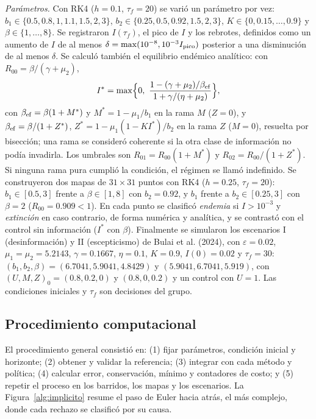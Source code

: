 \emph{Parámetros.} Con RK4 ($h=0.1$, $\tau_f=20$) se varió un parámetro por vez: $b_1\in\{0.5,0.8,1,1.1,1.5,2,3\}$, $b_2\in\{0.25,0.5,0.92,1.5,2,3\}$, $K\in\{0,0.15,\dots,0.9\}$ y $\beta\in\{1,\dots,8\}$. Se registraron $I(\tau_f)$, el pico de $I$ y los rebrotes, definidos como un aumento de $I$ de al menos $\delta=\max(10^{-8},10^{-3}I_{\rm pico})$ posterior a una disminución de al menos $\delta$. Se calculó también el equilibrio endémico analítico: con $R_{00}=\beta/(\gamma+\mu_2)$,
\begin{equation}
I^*=\max\Bigl\{0,\ \frac{1-(\gamma+\mu_2)/\beta_{\rm ef}}{1+\gamma/(\eta+\mu_2)}\Bigr\},
\end{equation}
con $\beta_{\rm ef}=\beta(1+M^*)$ y $M^*=1-\mu_1/b_1$ en la rama $M$ ($Z=0$), y $\beta_{\rm ef}=\beta/(1+Z^*)$, $Z^*=1-\mu_1(1-KI^*)/b_2$ en la rama $Z$ ($M=0$), resuelta por bisección; una rama se consideró coherente si la otra clase de información no podía invadirla. Los umbrales son $R_{01}=R_{00}(1+M^*)$ y $R_{02}=R_{00}/(1+Z^*)$. Si ninguna rama pura cumplió la condición, el régimen se llamó indefinido. Se construyeron dos mapas de $31\times31$ puntos con RK4 ($h=0.25$, $\tau_f=20$): $b_1\in[0.5,3]$ frente a $\beta\in[1,8]$ con $b_2=0.92$, y $b_1$ frente a $b_2\in[0.25,3]$ con $\beta=2$ ($R_{00}=0.909<1$). En cada punto se clasificó \emph{endemia} si $I>10^{-3}$ y \emph{extinción} en caso contrario, de forma numérica y analítica, y se contrastó con el control sin información ($I^*$ con $\beta$). Finalmente se simularon los escenarios I (desinformación) y II (escepticismo) de Bulai et al. (2024), con $\varepsilon=0.02$, $\mu_1=\mu_2=5.2143$, $\gamma=0.1667$, $\eta=0.1$, $K=0.9$, $I(0)=0.02$ y $\tau_f=30$: $(b_1,b_2,\beta)=(6.7041,5.9041,4.8429)$ y $(5.9041,6.7041,5.919)$, con $(U,M,Z)_0=(0.8,0.2,0)$ y $(0.8,0,0.2)$ y un control con $U=1$. Las condiciones iniciales y $\tau_f$ son decisiones del grupo.

\subsection{Procedimiento computacional}
El procedimiento general consistió en: (1) fijar parámetros, condición inicial y horizonte; (2) obtener y validar la referencia; (3) integrar con cada método y política; (4) calcular error, conservación, mínimo y contadores de costo; y (5) repetir el proceso en los barridos, los mapas y los escenarios. La Figura~\ref{alg:implicito} resume el paso de Euler hacia atrás, el más complejo, donde cada rechazo se clasificó por su causa.


